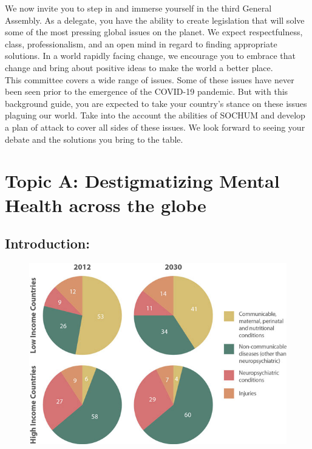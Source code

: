 \documentclass[10pt, letterpaper]{article}
\begin{document}
We now invite you to step in and immerse yourself in the third General
Assembly. As a delegate, you have the ability to create legislation that
will solve some of the most pressing global issues on the planet. We
expect respectfulness, class, professionalism, and an open mind in
regard to finding appropriate solutions. In a world rapidly facing
change, we encourage you to embrace that change and bring about positive
ideas to make the world a better place. \\

This committee covers a wide range of issues. Some of these issues have
never been seen prior to the emergence of the COVID-19 pandemic. But
with this background guide, you are expected to take your country's
stance on these issues plaguing our world. Take into the account the
abilities of SOCHUM and develop a plan of attack to cover all sides of
these issues. We look forward to seeing your debate and the solutions
you bring to the table. \\

\newpage
\section{{Topic A: Destigmatizing Mental Health across the
globe}}

\subsection{Introduction:}

\begin{figure}
\centering
\includegraphics[scale = 0.4]{image1.jpg}
\end{figure}
\end{document}
